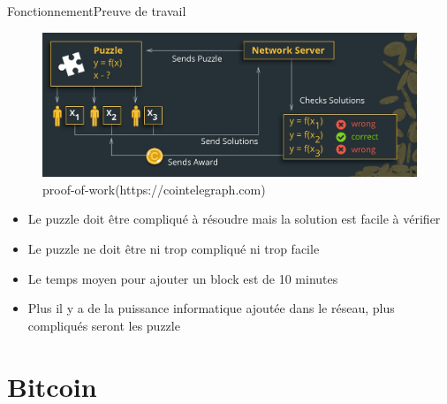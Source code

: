 \documentclass[xcolor=dvipsnames]{beamer}
\begin{document}
\begin{frame}{Fonctionnement}{Preuve de travail}
\begin{figure}
		\includegraphics[scale=0.15]{pow.jpg} 
		\caption{proof-of-work(https://cointelegraph.com)}
	\end{figure}
	
	\begin{center}
		\begin{itemize}
			\item Le puzzle doit être compliqué à résoudre mais la solution est facile à vérifier
			\item Le puzzle ne doit être ni trop compliqué ni trop facile
			\item Le temps moyen pour ajouter un block est de 10 minutes
			\item Plus il y a de la puissance informatique ajoutée dans le réseau, plus compliqués seront les puzzle
		\end{itemize}
	\end{center}
\end{frame}

\section{Bitcoin}
\end{document}
